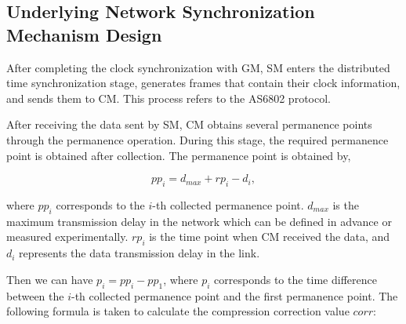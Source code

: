 \documentclass[conference]{IEEEtran}
\begin{document}
\subsection{Underlying Network Synchronization Mechanism Design}\label{BB}

After completing the clock synchronization with GM, SM enters the distributed time synchronization stage, generates frames that contain their clock information, and sends them to CM. This process refers to the AS6802 protocol.

After receiving the data sent by SM, CM obtains several permanence points through the permanence operation. During this stage, the required permanence point is obtained after collection. The permanence point is obtained by,

\begin{equation}
p{p_i} = d_{max} + r{p_i} - d_i, \label {eq7}
\end{equation}

\noindent where $pp_i$ corresponds to the $i$-th collected permanence point. $d_{max}$ is the maximum transmission delay in the network which can be defined in advance or measured experimentally. $r{p_i}$ is the time point when CM received the data, and $d_i$ represents the data transmission delay in the link.

Then we can have ${{p_i} = p{p_i} - p{p_1}}$, where $p_i$ corresponds to the time difference between the $i$-th collected permanence point and the first permanence point. The following formula is taken to calculate the compression correction value $corr$:

\end{document}
